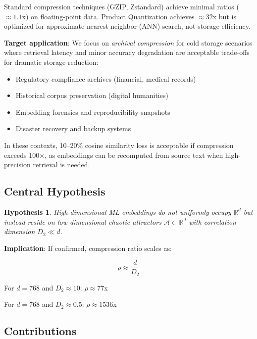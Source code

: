 \documentclass[11pt,a4paper]{article}
\newtheorem{hypothesis}{Hypothesis}
\begin{document}
Standard compression techniques (GZIP, Zstandard) achieve minimal ratios ($\approx 1.1$x) on floating-point data. Product Quantization \cite{jegou2011product} achieves $\approx 32$x but is optimized for approximate nearest neighbor (ANN) search, not storage efficiency.

\textbf{Target application}: We focus on \textit{archival compression} for cold storage scenarios where retrieval latency and minor accuracy degradation are acceptable trade-offs for dramatic storage reduction:
\begin{itemize}
\item Regulatory compliance archives (financial, medical records)
\item Historical corpus preservation (digital humanities)
\item Embedding forensics and reproducibility snapshots
\item Disaster recovery and backup systems
\end{itemize}

In these contexts, 10--20\% cosine similarity loss is acceptable if compression exceeds 100$\times$, as embeddings can be recomputed from source text when high-precision retrieval is needed.

\subsection{Central Hypothesis}

\begin{hypothesis}
High-dimensional ML embeddings do not uniformly occupy $\mathbb{R}^d$ but instead reside on low-dimensional chaotic attractors $\mathcal{A} \subset \mathbb{R}^d$ with correlation dimension $D_2 \ll d$.
\end{hypothesis}

\textbf{Implication}: If confirmed, compression ratio scales as:

\begin{equation}
\rho \approx \frac{d}{D_2}
\end{equation}

For $d = 768$ and $D_2 \approx 10$: $\rho \approx 77$x

For $d = 768$ and $D_2 \approx 0.5$: $\rho \approx 1536$x

\subsection{Contributions}
\end{document}
